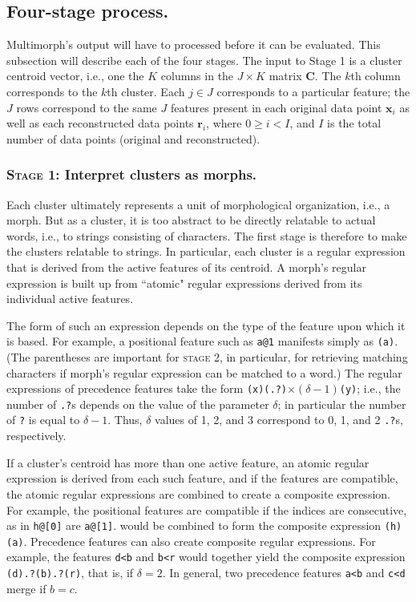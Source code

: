 \subsection{Four-stage process.} \label{sec:extrinsic}
Multimorph's output 
will have to processed before it can be evaluated. This subsection 
will describe each of the four stages. The input to Stage 1 is a cluster centroid vector, 
i.e., one the $K$ columns in the $J \times K$ matrix $\mathbf{C}$. The $k$th column 
corresponds to the $k$th cluster. Each $j \in J$ corresponds to a particular feature; the 
$J$ rows correspond to the same $J$ features present in each original data point 
$\mathbf{x}_{i}$ as well as each reconstructed data points $\mathbf{r}_{i}$, where 
$0 \ge i < I$, and $I$ is the total number of data points (original and reconstructed).

\subsubsection{\textsc{Stage 1:} Interpret clusters as morphs.} Each cluster ultimately represents a unit of morphological organization, i.e., a morph. But as a cluster, it is too abstract to be directly relatable to actual words, i.e., to strings consisting of characters. The first stage is therefore
to make the clusters relatable to strings. In particular, each cluster is a regular expression that is derived from the active features of its centroid. A morph's regular expression is built up from ``atomic" regular expressions derived from its individual active features. 

The form of such an expression depends on the type of the feature 
upon which it is based. For example, a positional feature such as 
\texttt{a@1} manifests simply as \texttt{(a)}. (The parentheses 
are important for \textsc{stage 2}, in particular, for retrieving 
matching characters if morph's regular expression can be matched 
to a word.) The regular expressions of precedence features take the 
form \texttt{(x)(.?)}$\times (\delta-1)$\texttt{(y)}; i.e., the number 
of \texttt{.?}s depends on the value of the parameter $\delta$; in 
particular the number of \texttt{?} is equal to $\delta- 1$. Thus, 
$\delta$ values of 1, 2, and 3 correspond to 0, 1, and 2 \texttt{.?}s,
 respectively. 

If a cluster's centroid has more than one active feature, an 
atomic regular expression is derived from each such feature, 
and if the features are compatible, the atomic regular expressions 
are combined to create a composite expression. For example, the 
positional features are compatible if the indices are consecutive, 
as in \texttt{h@[0]} are \texttt{a@[1]}. would be combined 
to form the composite expression \texttt{(h)(a)}. Precedence features 
can also create composite regular expressions. For example, the 
features \texttt{d<b} and \texttt{b<r} would together yield the 
composite expression \texttt{(d).?(b).?(r)}, that is, if $\delta = 2$. 
In general, two precedence features \texttt{a<b} and \texttt{c<d} 
merge if $b=c$.

